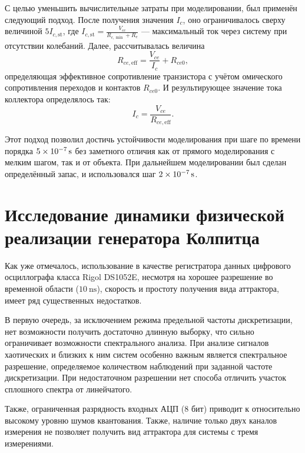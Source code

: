 С целью уменьшить вычислительные затраты при моделировании,
был применён следующий подход. После получения значения $I_c$,
оно ограничивалось сверху величиной
$ 5 I_{c,\mathrm{st}}$,
где
$ I_{c,\mathrm{st}} = \frac{V_{cc}}{R_{c,{\min}}+R_e}$ --- максимальный ток через систему
при отсутствии колебаний. Далее, рассчитывалась величина
%
\[
  R_{ce,\mathrm{eff}} = \frac{V_{ce}}{I_c} + R_{ce0},
\]
определяющая эффективное сопротивление транзистора с учётом омического
сопротивления переходов и контактов $R_{ce0}$.
И результирующее значение тока коллектора определялось так:
%
\[
  I_c = \frac{V_{ce}}{R_{ce,\mathrm{eff}}}.
\]

Этот подход позволил достичь устойчивости моделирования
при шаге по времени
порядка $\SI{5E-7}{\second}$
без заметного отличия как от прямого моделирования с мелким шагом,
так и от объекта.
При дальнейшем моделировании был сделан определённый запас,
и использовался шаг $\SI{2E-7}{\second}$.



\section{Исследование динамики физической реализации генератора Колпитца} %


Как уже отмечалось, использование в качестве регистратора данных
цифрового осциллографа класса Rigol DS1052E,
несмотря на  хорошее разрешение во временной области ($\SI{10}{\nano\second}$),
скорость и простоту получения вида аттрактора,
имеет ряд существенных недостатков.

В первую очередь, за исключением режима предельной частоты дискретизации,
нет возможности получить достаточно длинную выборку, что
сильно ограничивает возможности спектрального анализа.
При анализе сигналов хаотических и близких к ним систем
особенно важным является спектральное разрешение,
определяемое количеством наблюдений при заданной частоте дискретизации.
При недостаточном разрешении нет способа отличить участок сплошного спектра
от линейчатого.

Также, ограниченная разрядность входных АЦП (8 бит)
приводит к относительно высокому уровню шумов квантования.
Также, наличие только двух каналов измерения не позволяет
получить вид аттрактора для системы с тремя измерениями.


